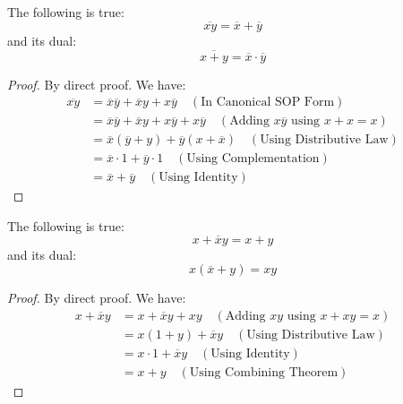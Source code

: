 \documentclass[11pt]{report}
\begin{document}
\begin{theorem}
    The following is true:
    $$
    \overline{xy} = \overline{x} + \overline{y}
    $$
    and its dual:
    $$
    \overline{x + y} = \overline{x} \cdot \overline{y}
    $$
\end{theorem}
\begin{proof}
    By direct proof. We have:
    \begin{align*}
        \overline{xy} &= \overline{x}\overline{y} + \overline{x}y + x\overline{y} \quad (\text{In Canonical SOP Form}) \\
        &= \overline{x}\overline{y} + \overline{x}y + x\overline{y} + x\overline{y} \quad (\text{Adding } x\overline{y} \text{ using $x + x = x$}) \\
        &= \overline{x}(\overline{y} + y) + \overline{y}(x + \overline{x}) \quad (\text{Using Distributive Law}) \\
        &= \overline{x} \cdot 1 + \overline{y} \cdot 1 \quad (\text{Using Complementation}) \\
        &= \overline{x} + \overline{y} \quad (\text{Using Identity})
    \end{align*}
\end{proof}

\begin{theorem}
    The following is true:
    $$
    x + \overline{x}y = x + y
    $$
    and its dual:
    $$
    x(\overline{x} + y) = xy
    $$
\end{theorem}
\begin{proof}
    By direct proof. We have:
    \begin{align*}
        x + \overline{x}y &= x + \overline{x}y + xy \quad (\text{Adding } xy \text{ using } x + xy = x) \\
        &= x(1 + y) + \overline{x}y \quad (\text{Using Distributive Law}) \\
        &= x \cdot 1 + \overline{x}y \quad (\text{Using Identity}) \\
        &= x + y \quad (\text{Using Combining Theorem})
    \end{align*}
\end{proof}
\end{document}
